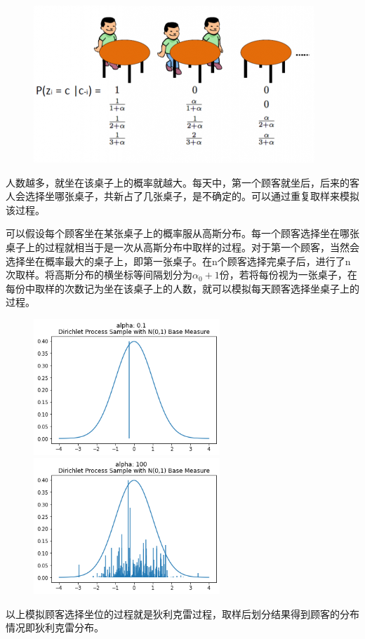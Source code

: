 \documentclass[a4paper,twoside]{article}
\theoremstyle{definition} \newtheorem{law}[thm]{Law}
\theoremstyle{plain} \newtheorem{jury}[thm]{Jury}
\theoremstyle{remark} \newtheorem*{marg}{Margaret}
\begin{document}
\begin{figure}[H]
    \centering
    \includegraphics{JLU_bachelor/appendix_fig/chinese.png}
    \label{fig:chinese}
\end{figure}

人数越多，就坐在该桌子上的概率就越大。每天中，第一个顾客就坐后，后来的客人会选择坐哪张桌子，共新占了几张桌子，是不确定的。可以通过重复取样来模拟该过程。

可以假设每个顾客坐在某张桌子上的概率服从高斯分布。每一个顾客选择坐在哪张桌子上的过程就相当于是一次从高斯分布中取样的过程。对于第一个顾客，当然会选择坐在概率最大的桌子上，即第一张桌子。在n个顾客选择完桌子后，进行了n次取样。将高斯分布的横坐标等间隔划分为$\alpha_0+1$份，若将每份视为一张桌子，在每份中取样的次数记为坐在该桌子上的人数，就可以模拟每天顾客选择坐桌子上的过程。
\begin{figure}[H]
    \includegraphics[width=7cm]{JLU_bachelor/appendix_fig/dping1.png}
    \includegraphics[width=7cm]{JLU_bachelor/appendix_fig/dipping2.png}
    \label{fig:dirich_process}
\end{figure}
以上模拟顾客选择坐位的过程就是狄利克雷过程，取样后划分结果得到顾客的分布情况即狄利克雷分布。
\end{document}
